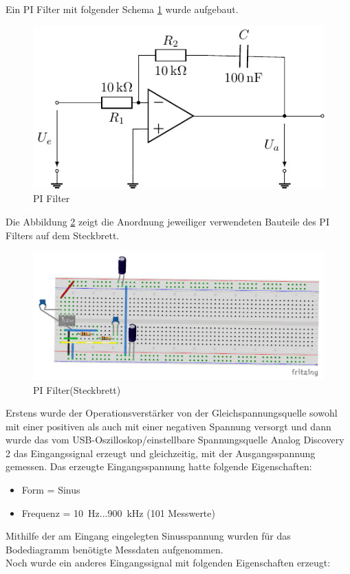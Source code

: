 Ein PI Filter mit folgender Schema \ref{fig:PI_Filter_circuit} wurde aufgebaut.

\begin{figure}[H]
  \centering
  \includegraphics[width=0.5\linewidth]{Elektronik-Laborprotokoll_Filter/Circuits/PI_Filter.pdf}
  \caption{PI Filter}
  \label{fig:PI_Filter_circuit}
\end{figure}

Die Abbildung \ref{fig:Steckbrett_PI-Filter} zeigt die Anordnung jeweiliger verwendeten Bauteile des PI Filters auf dem Steckbrett.

\begin{figure}[H]
  \centering
  \includegraphics[width=0.4\linewidth]{Elektronik-Laborprotokoll_Filter/Abbildungen/Steckbrett_Bilder/Steckbrett_PI-Filter.pdf}
  \caption{PI Filter(Steckbrett)}
  \label{fig:Steckbrett_PI-Filter}
\end{figure}

Erstens wurde der Operationsverstärker von der Gleichspannungsquelle sowohl mit einer positiven als auch mit einer negativen Spannung versorgt und dann wurde das vom USB-Oszilloskop/einstellbare Spannungsquelle Analog Discovery 2 das Eingangssignal erzeugt und gleichzeitig, mit der Ausgangsspannung gemessen. Das erzeugte Eingangsspannung hatte folgende Eigenschaften:

\begin{itemize}
    \item Form = Sinus 
    \item Frequenz = \SI{10}{\hertz}...\SI{900}{\kilo\hertz} (101 Messwerte)
\end{itemize}
%
Mithilfe der am Eingang eingelegten Sinusspannung wurden für das Bodediagramm benötigte Messdaten aufgenommen.\\
%
Noch wurde ein anderes Eingangssignal mit folgenden Eigenschaften erzeugt:

